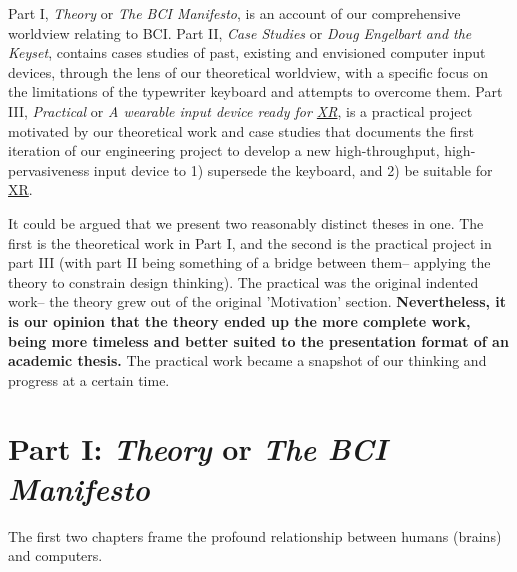 \documentclass[logo,bsc,singlespacing,parskip]{infthesis}
\begin{document}
Part I, \emph{Theory} or \emph{The BCI Manifesto}, is an account of our comprehensive worldview relating to BCI.
Part II, \emph{Case Studies} or \emph{Doug Engelbart and the Keyset}, contains cases studies of past, existing and envisioned computer input devices, through the lens of our theoretical worldview, with a specific focus on the limitations of the typewriter keyboard and attempts to overcome them.
Part III, \emph{Practical} or \emph{A wearable input device ready for \hyperref[org88b0f70]{XR}}, is a practical project motivated by our theoretical work and case studies that documents the first iteration of our engineering project to develop a new high-throughput, high-pervasiveness input device to 1) supersede the keyboard, and 2) be suitable for \hyperref[org88b0f70]{XR}.

It could be argued that we present two reasonably distinct theses in one.
The first is the theoretical work in Part I, and the second is the practical project in part III (with part II being something of a bridge between them-- applying the theory to constrain design thinking).
The practical was the original indented work-- the theory grew out of the original 'Motivation' section.
\textbf{Nevertheless, it is our opinion that the theory ended up the more complete work, being more timeless and better suited to the presentation format of an academic thesis.}
The practical work became a snapshot of our thinking and progress at a certain time.
\section*{Part I: \emph{Theory} or \emph{The BCI Manifesto}}
\label{sec:orgb8475cd}
The first two chapters frame the profound relationship between humans (brains) and computers.
\end{document}
